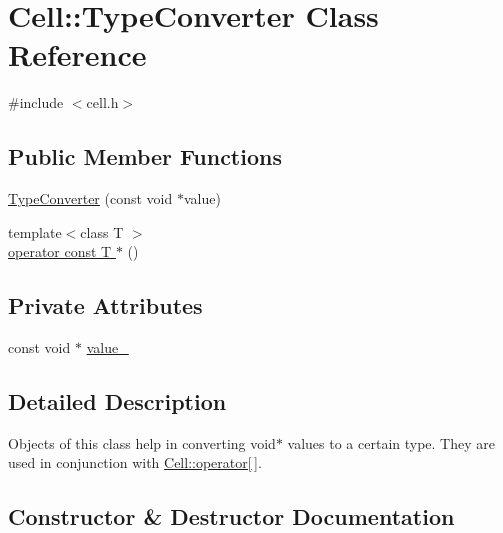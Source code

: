 \hypertarget{classCell_1_1TypeConverter}{}\section{Cell\+:\+:Type\+Converter Class Reference}
\label{classCell_1_1TypeConverter}


{\ttfamily \#include $<$cell.\+h$>$}

\subsection*{Public Member Functions}
\begin{DoxyCompactItemize}
\item 
\hyperlink{classCell_1_1TypeConverter_ac7bd5962b6cf2ed1f41557386f2bfb59}{Type\+Converter} (const void $\ast$value)
\item 
{\footnotesize template$<$class T $>$ }\\\hyperlink{classCell_1_1TypeConverter_a66d5513aa55f1b6f9546e08b50826ef4}{operator const T $\ast$} ()
\end{DoxyCompactItemize}
\subsection*{Private Attributes}
\begin{DoxyCompactItemize}
\item 
const void $\ast$ \hyperlink{classCell_1_1TypeConverter_a6c64d7872e749b36cb55618c0b1bafef}{value\+\_\+}
\end{DoxyCompactItemize}


\subsection{Detailed Description}
Objects of this class help in converting void$\ast$ values to a certain type. They are used in conjunction with \hyperlink{classCell_a8893e8d102e653edd669eef55994c61f}{Cell\+::operator\mbox{[}$\,$\mbox{]}}. 

\subsection{Constructor \& Destructor Documentation}
\hypertarget{classCell_1_1TypeConverter_ac7bd5962b6cf2ed1f41557386f2bfb59}{}
